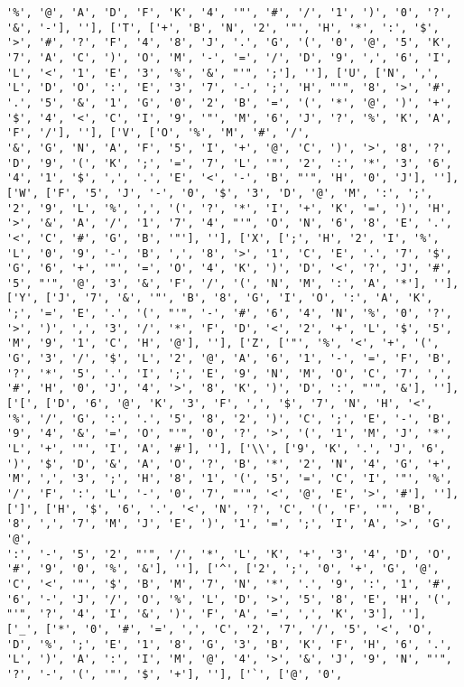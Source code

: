 \documentclass{article}
\begin{document}
\begin{verbatim}
'%', '@', 'A', 'D', 'F', 'K', '4', '"', '#', '/', '1', ')', '0', '?', '&', '-'], ''], ['T', ['+', 'B', 'N', '2', '"', 'H', '*', ':', '$', '>', '#', '?', 'F', '4', '8', 'J', '.', 'G', '(', '0', '@', '5', 'K', '7', 'A', 'C', ')', 'O', 'M', '-', '=', '/', 'D', '9', ',', '6', 'I', 'L', '<', '1', 'E', '3', '%', '&', "'", ';'], ''], ['U', ['N', ',', 'L', 'D', 'O', ':', 'E', '3', '7', '-', ';', 'H', "'", '8', '>', '#', '.', '5', '&', '1', 'G', '0', '2', 'B', '=', '(', '*', '@', ')', '+', '$', '4', '<', 'C', 'I', '9', '"', 'M', '6', 'J', '?', '%', 'K', 'A', 'F', '/'], ''], ['V', ['O', '%', 'M', '#', '/', 
'&', 'G', 'N', 'A', 'F', '5', 'I', '+', '@', 'C', ')', '>', '8', '?', 'D', '9', '(', 'K', ';', '=', '7', 'L', '"', '2', ':', '*', '3', '6', '4', '1', '$', ',', '.', 'E', '<', '-', 'B', "'", 'H', '0', 'J'], ''], ['W', ['F', '5', 'J', '-', '0', '$', '3', 'D', '@', 'M', ':', ';', '2', '9', 'L', '%', ',', '(', '?', '*', 'I', '+', 'K', '=', ')', 'H', '>', '&', 'A', '/', '1', '7', '4', "'", 'O', 'N', '6', '8', 'E', '.', '<', 'C', '#', 'G', 'B', '"'], ''], ['X', [';', 'H', '2', 'I', '%', 'L', '0', '9', '-', 'B', ',', '8', '>', '1', 'C', 'E', '.', '7', '$', 'G', '6', '+', '"', '=', 'O', '4', 'K', ')', 'D', '<', '?', 'J', '#', '5', "'", '@', '3', '&', 'F', '/', '(', 'N', 'M', ':', 'A', '*'], ''], ['Y', ['J', '7', '&', '"', 'B', '8', 'G', 'I', 'O', ':', 'A', 'K', ';', '=', 'E', '.', '(', "'", '-', '#', '6', '4', 'N', '%', '0', '?', '>', ')', ',', '3', '/', '*', 'F', 'D', '<', '2', '+', 'L', '$', '5', 'M', '9', '1', 'C', 'H', '@'], ''], ['Z', ['"', '%', '<', '+', '(', 'G', '3', '/', '$', 'L', '2', '@', 'A', '6', '1', '-', '=', 'F', 'B', '?', '*', '5', '.', 'I', ';', 'E', '9', 'N', 'M', 'O', 'C', '7', ',', '#', 'H', '0', 'J', '4', '>', '8', 'K', ')', 'D', ':', "'", '&'], ''], ['[', ['D', '6', '@', 'K', '3', 'F', ',', '$', '7', 'N', 'H', '<', '%', '/', 'G', ':', '.', '5', '8', '2', ')', 'C', ';', 'E', '-', 'B', '9', '4', '&', '=', 'O', "'", '0', '?', '>', '(', '1', 'M', 'J', '*', 'L', '+', '"', 'I', 'A', '#'], ''], ['\\', ['9', 'K', '.', 'J', '6', ')', '$', 'D', '&', 'A', 'O', '?', 'B', '*', '2', 'N', '4', 'G', '+', 'M', ',', '3', ';', 'H', '8', '1', '(', '5', '=', 'C', 'I', '"', '%', '/', 'F', ':', 'L', '-', '0', '7', "'", '<', '@', 'E', '>', '#'], ''], [']', ['H', '$', '6', '.', '<', 'N', '?', 'C', '(', 'F', '"', 'B', '8', ',', '7', 'M', 'J', 'E', ')', '1', '=', ';', 'I', 'A', '>', 'G', '@', 
':', '-', '5', '2', "'", '/', '*', 'L', 'K', '+', '3', '4', 'D', 'O', '#', '9', '0', '%', '&'], ''], ['^', ['2', ';', '0', '+', 'G', '@', 'C', '<', '"', '$', 'B', 'M', '7', 'N', '*', '.', '9', ':', '1', '#', '6', '-', 'J', '/', 'O', '%', 'L', 'D', '>', '5', '8', 'E', 'H', '(', "'", '?', '4', 'I', '&', ')', 'F', 'A', '=', ',', 'K', '3'], ''], ['_', ['*', '0', '#', '=', ',', 'C', '2', '7', '/', '5', '<', 'O', 'D', '%', ';', 'E', '1', '8', 'G', '3', 'B', 'K', 'F', 'H', '6', '.', 'L', ')', 'A', ':', 'I', 'M', '@', '4', '>', '&', 'J', '9', 'N', "'", '?', '-', '(', '"', '$', '+'], ''], ['`', ['@', '0', 

\end{verbatim}
\end{document}
